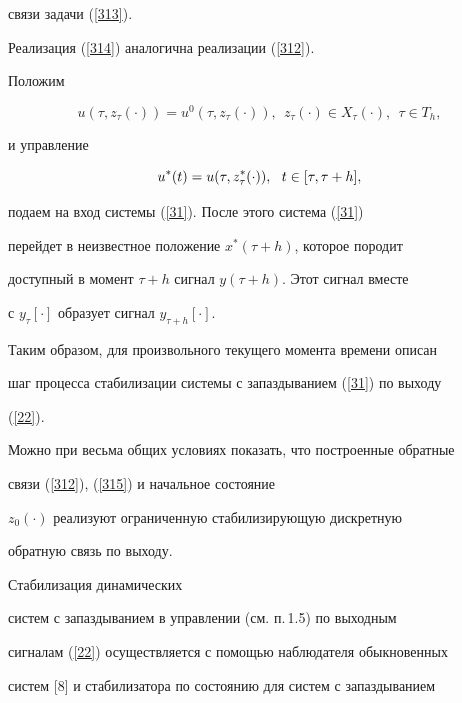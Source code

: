 связи задачи (\ref{313}).





Реализация (\ref{314}) аналогична реализации (\ref{312}).





Положим


\begin{equation}\label{315}


u(\tau,z_{\tau}(\cdot))=u^0(\tau,z_{\tau}(\cdot)),\ \ z_{\tau}(\cdot)


\in X_{\tau}(\cdot),\ \ \tau \in T_h,


\end{equation}


и управление


$$


u^*(t)=u(\tau,z_{\tau}^*(\cdot)),\ \ t \in [\tau,\tau+h], \tts{[}


$$


подаем на вход системы (\ref{31}). После этого система (\ref{31})


перейдет в неизвестное положение $x^*(\tau+h)$, которое породит


доступный в момент $\tau+h$ сигнал $y(\tau+h)$. Этот сигнал вместе


с $y_\tau[\cdot]$ образует сигнал $y_{\tau+h}[\cdot]$.





Таким образом, для произвольного текущего момента времени описан


шаг процесса стабилизации системы с запаздыванием (\ref{31}) по выходу


(\ref{22}).





Можно при весьма общих условиях показать, что построенные обратные


связи (\ref{312}), (\ref{315}) и начальное состояние


$z_{0}(\cdot)$ реализуют ограниченную стабилизирующую дискретную


обратную связь по выходу.


Стабилизация динамических


систем с запаздыванием в управлении (см. п.\,1.5) по выходным


сигналам (\ref{22}) осуществляется с помощью наблюдателя обыкновенных


систем [8] и стабилизатора по состоянию для систем с запаздыванием


